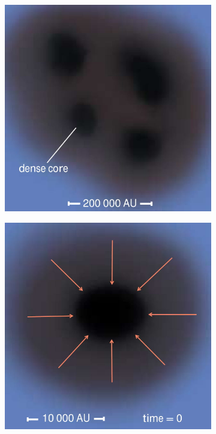 \begin{figure}[h]
	\begin{subfigure}[c]{0.3\textwidth}
		\includegraphics[width=\textwidth]{img/sf1-1}
		\label{fig:star-formation:1}
	\end{subfigure}\hfill%
	\begin{subfigure}[c]{0.3\textwidth}
		\includegraphics[width=\textwidth]{img/sf2-1}

\end{subfigure}
\end{figure}
